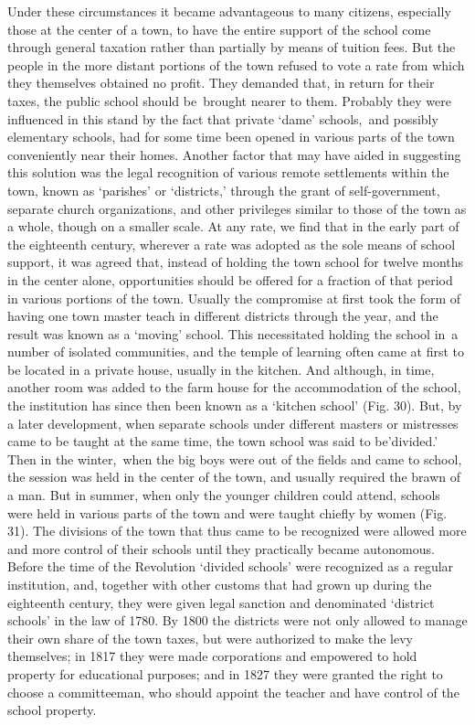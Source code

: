 \documentclass[]{book}
\begin{document}
Under these circumstances it became advantageous to many citizens, especially those at the center of a town, to have the entire support of the school come through general taxation rather than partially by means of tuition fees. But the people in the more distant portions of the town refused to vote a rate from which they themselves obtained no profit. They demanded that, in return for their taxes, the public school should be~brought nearer to them. Probably they were influenced in this stand by the fact that private `dame' schools,~and possibly elementary schools, had for some time been opened in various parts of the town conveniently near their homes. Another factor that may have aided in suggesting this solution was the legal recognition of various remote settlements within the town, known as `parishes' or `districts,' through the grant of self-government, separate church organizations, and other privileges similar to those of the town as a whole, though on a smaller scale. At any rate, we find that in the early part of the eighteenth century, wherever a rate was adopted as the sole means of school support, it was agreed that, instead of holding the town school for twelve months in the center alone, opportunities should be offered for a fraction of that period in various portions of the town. Usually the compromise at first took the form of having one town master teach in different districts through the year, and the result was known as a `moving' school. This necessitated holding the school in~a number of isolated communities, and the temple of learning often came at first to be located in a private house, usually in the kitchen. And although, in time, another room was added to the farm house for the accommodation of the school, the institution has since then been known as a `kitchen school' (Fig. 30). But, by a later development, when separate schools under different masters or mistresses came to be taught at the same time, the town school was said to be'divided.' Then in the winter,~when the big boys were out of the fields and came to school, the session was held in the center of the town, and usually required the brawn of a man. But in summer, when only the younger children could attend, schools were held in various parts of the town and were taught chiefly by women (Fig. 31). The divisions of the town that thus came to be recognized were allowed more and more control of their schools until they practically became autonomous. Before the time of the Revolution `divided schools' were recognized as a regular institution, and, together with other customs that had grown up during the eighteenth century, they were given legal sanction and denominated `district schools' in the law of 1780. By 1800 the districts were not only allowed to manage their own share of the town taxes, but were authorized to make the levy themselves; in 1817 they were made corporations and empowered to hold property for educational purposes; and in 1827 they were granted the right to choose a committeeman, who should appoint the teacher and have control of the school property.
\end{document}
